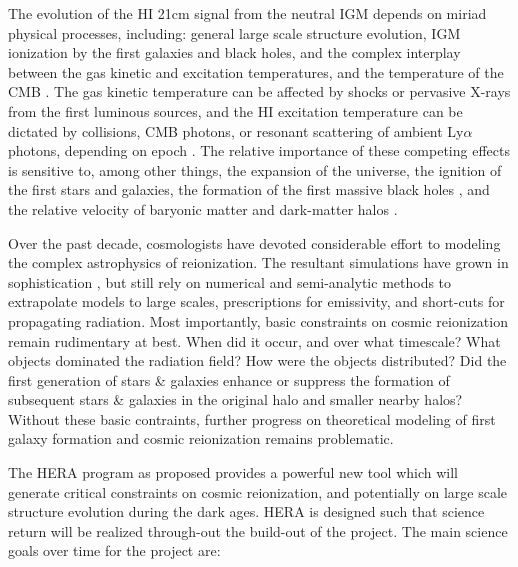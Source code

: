 \documentclass[preprint]{aastex}
\begin{document}
The evolution of the HI 21cm signal from the neutral IGM depends on miriad physical processes, including: general large scale structure evolution, IGM ionization by the first galaxies and black holes, and the complex interplay between the gas kinetic and excitation temperatures, and the temperature of the CMB \citep{furlanetto_et_al2006}. The gas kinetic temperature can be affected by shocks or pervasive X-rays from the first luminous sources, and the HI excitation temperature can be dictated by collisions, CMB photons, or resonant scattering of ambient Ly$\alpha$ photons, depending on epoch \citep{pritchard_loeb2012}.  The relative importance of these competing effects is sensitive to, among other things, the expansion of the universe, the
ignition of the first stars and galaxies, the formation of the first massive black holes
\citep{mesinger_et_al2013}, and the relative velocity of baryonic matter and dark-matter halos
\citep{mcquinn_oleary2012}.  

Over the past decade, cosmologists have devoted considerable effort to modeling the complex astrophysics of reionization. The resultant simulations have grown in
sophistication \citep{santos_et_al2010,mesinger_et_al2011,wyithe_loeb2004}, but still rely on numerical and semi-analytic methods to extrapolate models to large scales, prescriptions for emissivity, and short-cuts for propagating radiation.
Most importantly, basic constraints on cosmic reionization remain rudimentary at best. When did it occur, and over what timescale?  What objects dominated the radiation field? How were the objects distributed? Did the first generation of stars \& galaxies enhance or suppress the formation of subsequent stars \& galaxies in the original halo and smaller nearby halos? Without these basic contraints, 
further progress on theoretical modeling of first galaxy formation and cosmic reionization remains problematic. 

The HERA program as proposed provides a powerful new tool which will generate critical constraints on cosmic reionization, and potentially on large scale structure evolution during the dark ages. HERA is designed such that science return will be realized through-out the build-out of the project. The main science goals over time for the project are:

\end{document}
